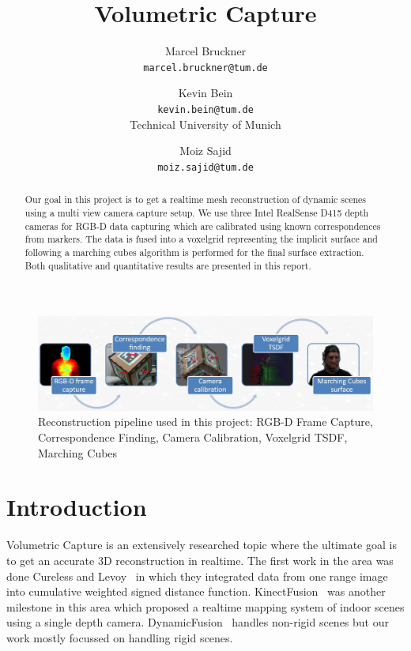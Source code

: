 \documentclass[10pt,twocolumn,letterpaper]{article}
\begin{document}
\title{Volumetric Capture}

\author{Marcel Bruckner\\
{\tt\small marcel.bruckner@tum.de}
\and
Kevin Bein\\
{\tt\small kevin.bein@tum.de}\\[0.5em]
Technical University of Munich
\and
Moiz Sajid\\
{\tt\small moiz.sajid@tum.de}
}

\maketitle

\begin{abstract}
   Our goal in this project is to get a realtime mesh reconstruction of dynamic scenes using a multi view camera capture setup. We use three Intel RealSense D415 depth cameras for RGB-D data capturing which are calibrated using known correspondences from markers. The data is fused into a voxelgrid representing the implicit surface and following a marching cubes algorithm is performed for the final surface extraction. Both qualitative and quantitative results are presented in this report.   
\end{abstract}


\begin{figure}[t]
	\begin{center}
		\includegraphics[width=1.0\linewidth]{imgs/pipeline}
	\end{center}
	\caption{Reconstruction pipeline used in this project: RGB-D Frame Capture, Correspondence Finding, Camera Calibration, Voxelgrid TSDF, Marching Cubes}
	\label{fig:long}
	\label{fig:onecol}
\end{figure}

\section{Introduction}

Volumetric Capture is an extensively researched topic where the ultimate goal is to get an accurate 3D reconstruction in realtime. The first work in the area was done Cureless and Levoy~\cite{Authors4} in which they integrated data from one range image into cumulative weighted signed distance function. KinectFusion~\cite{Authors5} was another milestone in this area which proposed a realtime mapping system of indoor scenes using a single depth camera. DynamicFusion~\cite{Authors6} handles non-rigid scenes but our work mostly focussed on handling rigid scenes. 
\end{document}

